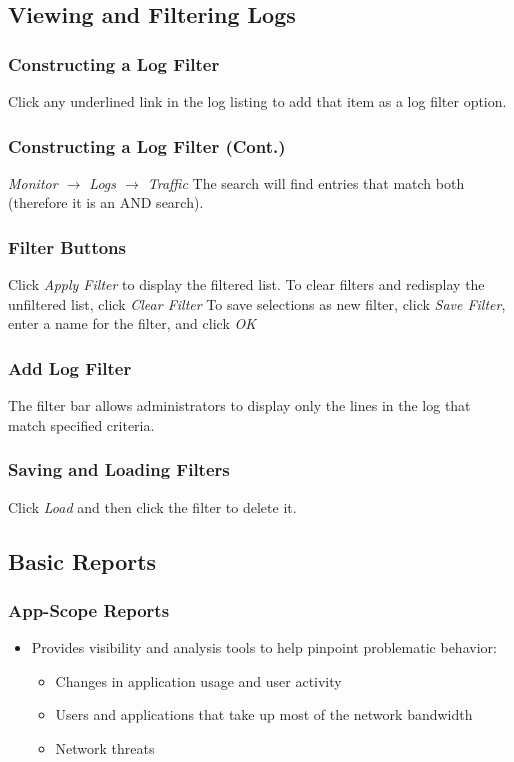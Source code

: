 \subsection{Viewing and Filtering Logs}
\subsubsection{Constructing a Log Filter}
Click any underlined link in the log listing to add that item as a log filter option. 
\subsubsection{Constructing a Log Filter (Cont.)}
\textit{Monitor $\rightarrow$ Logs $\rightarrow$ Traffic}
The search will find entries that match both (therefore it is an AND search).

\subsubsection{Filter Buttons}
Click \textit{Apply Filter} to display the filtered list.
To clear filters and redisplay the unfiltered list, click \textit{Clear Filter}
To save selections as new filter, click \textit{Save Filter}, enter a name for the filter, and click \textit{OK}
\subsubsection{Add Log Filter}
The filter bar allows administrators to display only the lines in the log that match specified criteria.

\subsubsection{Saving and Loading Filters}
Click \textit{Load} and then click the filter to delete it.

\subsection{Basic Reports}
\subsubsection{App-Scope Reports}
\begin{itemize}
    \item Provides visibility and analysis tools to help pinpoint problematic behavior:
        \begin{itemize}
            \item Changes in application usage and user activity
            \item Users and applications that take up most of the network bandwidth
            \item Network threats
        \end{itemize}
\end{itemize}

